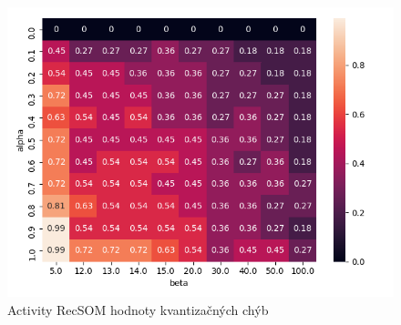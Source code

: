    \begin{figure}[H]
        \centering
        \includegraphics[width=\textwidth]{assets/ar_errors}
        \caption{Activity RecSOM hodnoty kvantizačných chýb}
        \label{errors_activity_recsom}
    \end{figure}
    

